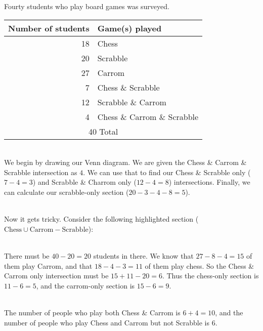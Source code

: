 \myexample
{
	Fourty students who play board games was surveyed.\\
	\begin{tabular}{r|l}
		\hline
		Number of students & Game(s) played\\
		\hline
		18 & Chess\\
		20 & Scrabble\\
		27 & Carrom\\
		7  & Chess \& Scrabble\\
		12 & Scrabble \& Carrom\\
		4  & Chess \& Carrom \& Scrabble\\
		\hline
		\multicolumn{2}{c}{40 Total}\\
		\hline
	\end{tabular}\\
	We begin by drawing our Venn diagram. We are given the Chess \& Carrom \& Scrabble intersection as $4$. We can use that to find our Chess \& Scrabble only ($7-4=3$) and Scrabble \& Charrom only ($12-4=8$) intersections. Finally, we can calculate our scrabble-only section ($20-3-4-8=5$).\\
	\begin{venndiagram3sets}[shade=skyblue,showframe=false,labelA={Chess},labelB={Scrabble},labelC={Carrom},labelABC={4},labelOnlyAB={3},labelOnlyBC={8},labelOnlyB={5}]
	\end{venndiagram3sets}\\
	Now it gets tricky. Consider the following highlighted section ($\text{Chess} \cup \text{Carrom} - \text{Scrabble}$):\\
	\begin{venndiagram3sets}[shade=skyblue,showframe=false,labelA={Chess},labelB={Scrabble},labelC={Carrom},labelABC={4},labelOnlyAB={3},labelOnlyBC={8},labelOnlyB={5}]
		\fillOnlyA \fillOnlyC \fillACapCNotB
	\end{venndiagram3sets}\\
	There must be $40-20=20$ students in there. We know that $27-8-4=15$ of them play Carrom, and that $18-4-3=11$ of them play chess. So the Chess \& Carrom only intersection must be $15+11-20=6$. Thus the chess-only section is $11-6=5$, and the carrom-only section is $15-6=9$.\\
	\begin{venndiagram3sets}[shade=skyblue,showframe=false,labelA={Chess},labelB={Scrabble},labelC={Carrom},labelABC={4},labelOnlyAB={3},labelOnlyBC={8},labelOnlyB={5},labelOnlyAC={6},labelOnlyA={5},labelOnlyC={9}]
	\end{venndiagram3sets}\\
	The number of people who play both Chess \& Carrom is $6+4=10$, and the number of people who play Chess and Carrom but not Scrabble is $6$.
}
